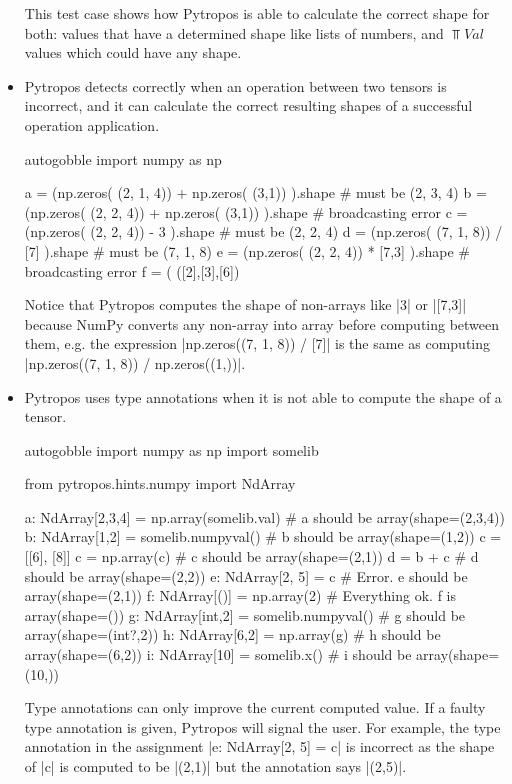 \begin{itemize}
  This test case shows how Pytropos is able to calculate the correct shape for both:
  values that have a determined shape like lists of numbers, and $\Top{Val}$ values which could
  have any shape.

\item Pytropos detects correctly when an operation between two tensors is incorrect, and
  it can calculate the correct resulting shapes of a successful operation application.

  \begin{pythoncode*}{autogobble}
     import numpy as np

     a = (np.zeros(  (2, 1, 4)) + np.zeros(    (3,1)) ).shape  # must be (2, 3, 4)
     b = (np.zeros(  (2, 2, 4)) + np.zeros(    (3,1)) ).shape  # broadcasting error
     c = (np.zeros(  (2, 2, 4)) - 3                   ).shape  # must be (2, 2, 4)
     d = (np.zeros(  (7, 1, 8)) / [7]                 ).shape  # must be (7, 1, 8)
     e = (np.zeros(  (2, 2, 4)) * [7,3]               ).shape  # broadcasting error
     f = (        ([2],[3],[6]) %
  \end{pythoncode*}

  Notice that Pytropos computes the shape of non-arrays like \pycode|3| or \pycode|[7,3]|
  because NumPy converts any non-array into array before computing between them, e.g. the
  expression \pycode|np.zeros((7, 1, 8)) / [7]| is the same as computing
  \pycode|np.zeros((7, 1, 8)) / np.zeros((1,))|.

\item Pytropos uses type annotations when it is not able to compute the shape of a tensor.

  \begin{pythoncode*}{autogobble}
    import numpy as np
    import somelib

    from pytropos.hints.numpy import NdArray

    a: NdArray[2,3,4] = np.array(somelib.val) # a should be array(shape=(2,3,4))
    b: NdArray[1,2] = somelib.numpyval()      # b should be array(shape=(1,2))
    c = [[6], [8]]
    c = np.array(c)                           # c should be array(shape=(2,1))
    d = b + c                                 # d should be array(shape=(2,2))
    e: NdArray[2, 5] = c                      # Error. e should be array(shape=(2,1))
    f: NdArray[()] = np.array(2)              # Everything ok. f is array(shape=())
    g: NdArray[int,2] = somelib.numpyval()    # g should be array(shape=(int?,2))
    h: NdArray[6,2] = np.array(g)             # h should be array(shape=(6,2))
    i: NdArray[10] = somelib.x()              # i should be array(shape=(10,))
  \end{pythoncode*}

  Type annotations can only improve the current computed value. If a faulty type
  annotation is given, Pytropos will signal the user. For example, the type annotation in
  the assignment \pycode|e: NdArray[2, 5] = c| is incorrect as the shape of \pycode|c| is
  computed to be \pycode|(2,1)| but the annotation says \pycode|(2,5)|.

\end{itemize}

